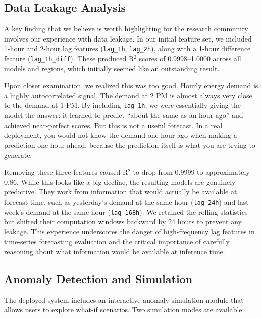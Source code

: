 \documentclass[conference]{IEEEtran}
\begin{document}
\subsection{Data Leakage Analysis}

A key finding that we believe is worth highlighting for the research community involves our experience with data leakage. In our initial feature set, we included 1-hour and 2-hour lag features (\texttt{lag\_1h}, \texttt{lag\_2h}), along with a 1-hour difference feature (\texttt{lag\_1h\_diff}). These produced R$^{2}$ scores of 0.9998--1.0000 across all models and regions, which initially seemed like an outstanding result.

Upon closer examination, we realized this was too good. Hourly energy demand is a highly autocorrelated signal. The demand at 2 PM is almost always very close to the demand at 1 PM. By including \texttt{lag\_1h}, we were essentially giving the model the answer: it learned to predict ``about the same as an hour ago'' and achieved near-perfect scores. But this is not a useful forecast. In a real deployment, you would not know the demand one hour ago when making a prediction one hour ahead, because the prediction itself is what you are trying to generate.

Removing these three features caused R$^{2}$ to drop from 0.9999 to approximately 0.86. While this looks like a big decline, the resulting models are genuinely predictive. They work from information that would actually be available at forecast time, such as yesterday's demand at the same hour (\texttt{lag\_24h}) and last week's demand at the same hour (\texttt{lag\_168h}). We retained the rolling statistics but shifted their computation windows backward by 24 hours to prevent any leakage. This experience underscores the danger of high-frequency lag features in time-series forecasting evaluation and the critical importance of carefully reasoning about what information would be available at inference time.

\subsection{Anomaly Detection and Simulation}

The deployed system includes an interactive anomaly simulation module that allows users to explore what-if scenarios. Two simulation modes are available:
\end{document}

